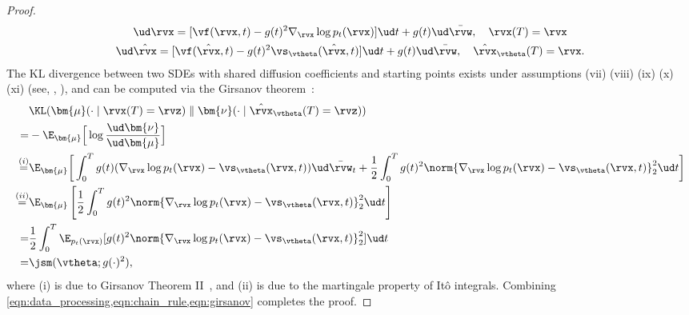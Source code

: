 \begin{proof}
\begin{gather*}
    \ud \rvx = [\vf(\rvx, t) - g(t)^2 \nabla_\rvx \log p_t(\rvx)]\ud t + g(t) \ud \bar{\rvw}, \quad \rvx(T) = \rvx\\
    \ud \hat{\rvx} = [\vf(\hat{\rvx}, t) - g(t)^2 \vs_\vtheta(\hat{\rvx}, t)]\ud t + g(t) \ud \bar{\rvw}, \quad \hat{\rvx}_\vtheta(T) = \rvx.
\end{gather*}
The KL divergence between two SDEs with shared diffusion coefficients and starting points exists under assumptions (vii) (viii) (ix) (x) (xi) (see, \eg, \cite{tzen-NeuralStochasticDifferential-2019a,li-ScalableGradientsStochastic-2020}), and can be computed via the Girsanov theorem~\cite{oksendal2013stochastic}:
\begin{align}
&\KL(\bm{\mu}(\cdot \mid \rvx(T) = \rvz)\mathrel\| \bm{\nu}(\cdot \mid \hat{\rvx}_\vtheta(T) = \rvz)) \notag\\
=& -\E_{\bm{\mu}}\Big[\log \frac{\ud \bm{\nu}}{\ud \bm{\mu}}\Big]\\
\stackrel{(i)}{=}& \E_{\bm{\mu}}\bigg[\int_0^T g(t) (\nabla_\rvx \log p_t(\rvx) - \vs_\vtheta(\rvx, t)) \ud \bar{\rvw}_t + \frac{1}{2} \int_0^T g(t)^2 \norm{\nabla_\rvx \log p_t(\rvx) - \vs_\vtheta(\rvx, t)}_2^2 \ud t\bigg]\notag \\
\stackrel{(ii)}{=}& \E_{\bm{\mu}}\left[\frac{1}{2} \int_0^T g(t)^2\norm{\nabla_\rvx \log p_t(\rvx) - \vs_\vtheta(\rvx, t)}_2^2 \ud t\right]\notag \\
=& \frac{1}{2} \int_0^T \E_{p_t(\rvx)}[g(t)^2\norm{\nabla_\rvx \log p_t(\rvx) - \vs_\vtheta(\rvx, t)}_2^2] \ud t \notag\\
=& \jsm(\vtheta; g(\cdot)^2),\label{eqn:girsanov}
\end{align}
where (i) is due to Girsanov Theorem II~\cite[Theorem 8.6.6]{oksendal2013stochastic}, and (ii) is due to the martingale property of It\^{o} integrals.
Combining \cref{eqn:data_processing,eqn:chain_rule,eqn:girsanov} completes the proof.
\end{proof}

